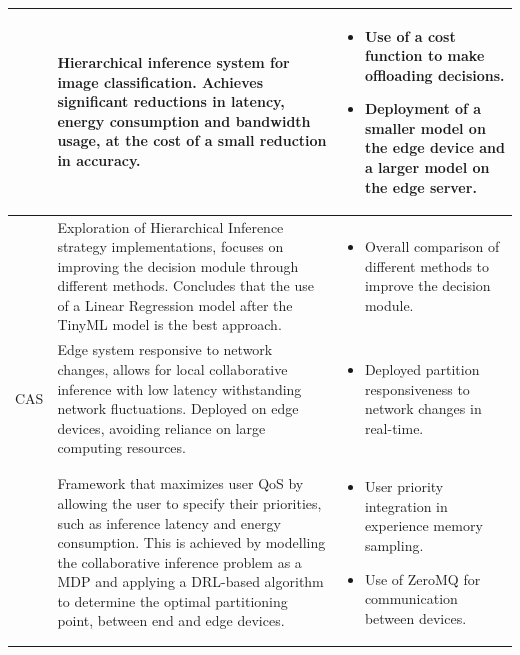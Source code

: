 \begin{xltabular}{\textwidth}{|m{2.4cm}|X|X|}
\textcite{al-atat_case_2023}
&
    Hierarchical inference system for image classification. Achieves significant
    reductions in latency, energy consumption and bandwidth usage, at the cost of
    a small reduction in accuracy.
&
    \begin{itemize}[noitemsep, topsep=0pt, leftmargin=*]
        \item Use of a cost function to make offloading decisions.
        \item Deployment of a smaller model on the edge device and a larger model on the edge server.
    \end{itemize}
\\
\hline
\textcite{behera_improved_2023}
&
    Exploration of Hierarchical Inference strategy implementations, focuses
    on improving the decision module through different methods. Concludes that
    the use of a Linear Regression model after the TinyML model is the best approach.
&
    \begin{itemize}[noitemsep, topsep=0pt, leftmargin=*]
        \item Overall comparison of different methods to improve the decision module.
    \end{itemize}
\\
\hline
CAS \cite{wang_context-aware_2021} 
& 
    Edge system responsive to network changes, allows for local collaborative
    inference with low latency withstanding network fluctuations. Deployed on
    edge devices, avoiding reliance on large computing resources.
&  
    \begin{itemize}[noitemsep, topsep=0pt, leftmargin=*]
        \item Deployed partition responsiveness to network changes in real-time.
    \end{itemize}
\\
\hline
\textcite{chen_deep_2024}
& 
    Framework that maximizes user \ac{QoS} by allowing the user to specify
    their priorities, such as inference latency and energy consumption.
    This is achieved by modelling the collaborative inference problem as a 
    \ac{MDP} and applying a \ac{DRL}-based algorithm to determine the optimal
    partitioning point, between end and edge devices.
&  
    \begin{itemize}[noitemsep, topsep=0pt, leftmargin=*]
        \item User priority integration in experience memory sampling.
        \item Use of ZeroMQ for communication between devices.

\end{itemize}
\end{xltabular}
